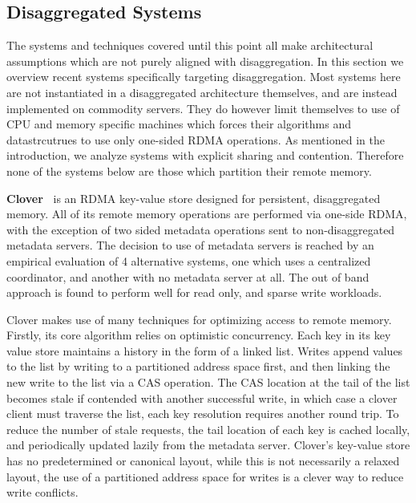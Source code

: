 

\subsection{Disaggregated Systems}

The systems and techniques covered until this point all make architectural
assumptions which are not purely aligned with disaggregation. In this section we
overview recent systems specifically targeting disaggregation. Most systems here
are not instantiated in a disaggregated architecture themselves, and are instead
implemented on commodity servers. They do however limit themselves to use of CPU
and memory specific machines which forces their algorithms and datastrcutrues to
use only one-sided RDMA operations. As mentioned in the introduction, we analyze
systems with explicit sharing and contention. Therefore none of the systems
below are those which partition their remote memory.

\textbf{Clover~\cite{clover}}
is an RDMA key-value store designed for persistent, disaggregated memory. All of
its remote memory operations are performed via one-side RDMA, with the exception
of two sided metadata operations sent to non-disaggregated metadata servers. The
decision to use of metadata servers is reached by an empirical evaluation of 4
alternative systems, one which uses a centralized coordinator, and another with
no metadata server at all. The out of band approach is found to perform well for
read only, and sparse write workloads. 

Clover makes use of many techniques for optimizing access to remote memory.
Firstly, its core algorithm relies on optimistic concurrency. Each key in its
key value store maintains a history in the form of a linked list. Writes append
values to the list by writing to a partitioned address space first, and then
linking the new write to the list via a CAS operation. The CAS location at the
tail of the list becomes stale if contended with another successful write, in
which case a clover client must traverse the list, each key resolution requires
another round trip. To reduce the number of stale requests, the tail location of
each key is cached locally, and periodically updated lazily from the metadata
server. Clover's key-value store has no predetermined or canonical layout, while
this is not necessarily a relaxed layout, the use of a partitioned address space
for writes is a clever way to reduce write conflicts.


